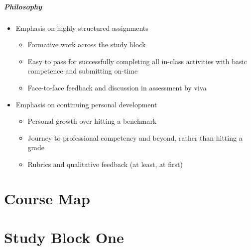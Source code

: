 \begin{frame}
	\frametitle{Philosophy}
	
	\begin{itemize}
		\item Emphasis on highly structured assignments 
		\begin{itemize}
			\item Formative work across the study block
			\item Easy to pass for successfully completing all in-class activities with basic competence and submitting on-time
			\item Face-to-face feedback and discussion in assessment by viva			
		\end{itemize}
		\pause\item Emphasis on continuing personal development
		\begin{itemize}
			\item Personal growth over hitting a benchmark
			\item Journey to professional competency and beyond, rather than hitting a grade
			\item Rubrics and qualitative feedback (at least, at first)			
		\end{itemize}
	\end{itemize}
\end{frame}

\part{Course Map}
\frame{\partpage}






\part{Study Block One}
\frame{\partpage}

